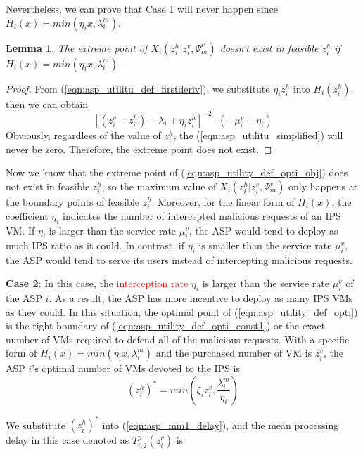 \documentclass[10pt,journal, compsoc]{IEEEtran}
\newtheorem{lemma}{Lemma}
\begin{document}
Nevertheless, we can prove that Case 1 will never happen since $H_i(x) = min(\eta_i{x}, \lambda_i^m)$. %
\begin{lemma} \label{lemma:asp_case1_not_exist}
The extreme point of $X_i(z_i^h|z_i^v,\Psi_m^v)$ doesn't exist in feasible $z_i^h$ if $H_i(x) = min(\eta_i{x}, \lambda_i^m)$.
\end{lemma}
\begin{proof}
From (\ref{eqn:asp_utilitu_def_firstderiv}), we substitute $\eta_i{z_i^h}$ into $H_i(z_i^h)$, then we can obtain
\begin{equation} \label{eqn:asp_utilitu_simplified}
[(z_i^v - z_i^h) - \lambda_i + \eta_i{z_i^h}]^{-2} \cdot (-\mu_i^v + \eta_i)
\end{equation}
Obviously, regardless of the value of $z_i^h$, the (\ref{eqn:asp_utilitu_simplified}) will never be zero. Therefore, the extreme point does not exist.\qedhere
\end{proof}
Now we know that the extreme point of (\ref{eqn:asp_utility_def_opti_obj}) does not exist in feasible $z_i^h$, so the maximum value of $X_i(z_i^h|z_i^v,\Psi_m^v)$ only happens at the boundary points of feasible $z_i^h$. Moreover, for the linear form of $H_i(x)$, the coefficient $\eta_i$ indicates the number of intercepted malicious requests of an IPS VM. If $\eta_i$ is larger than the service rate $\mu_i^v$, the ASP would tend to deploy as much IPS ratio as it could. In contrast, if $\eta_i$ is smaller than the service rate $\mu_i^v$, the ASP would tend to serve its users instead of intercepting malicious requests. 

\textbf{Case 2}: In this case, the \textcolor{red}{interception rate} $\eta_i$ is larger than the service rate $\mu_i^v$ of the ASP $i$. As a result, the ASP has more incentive to deploy as many IPS VMs as they could. In this situation, the optimal point of (\ref{eqn:asp_utility_def_opti}) is the right boundary of (\ref{eqn:asp_utility_def_opti_const1}) or the exact number of VMs required to defend all of the malicious requests. With a specific form of $H_i(x) = min(\eta_i x, \lambda_i^m)$ and the purchased number of VM is $z_i^v$, the ASP $i$'s optimal number of VMs devoted to the IPS is
\begin{equation} \label{eqn:asp_utility_def_first_boundary}
(z_i^h)^* = min(\xi_i z_i^v, \frac{\lambda_i^m}{\eta_i})
\end{equation}

We substitute $(z_i^h)^*$ into (\ref{eqn:asp_mm1_delay}), and the mean processing delay in this case denoted as $T_{i,2}^p(z_i^v)$ is
\end{document}
